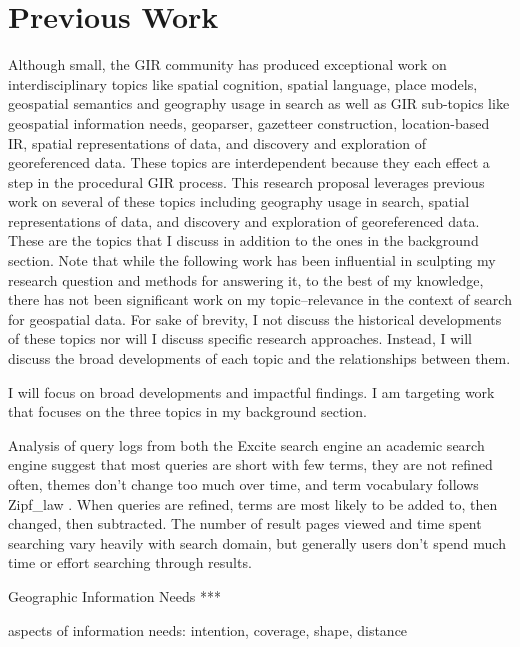 \chapter{Previous Work} \label{ch:[chapter 4 label]}

Although small, the GIR community has produced exceptional work on interdisciplinary topics like spatial cognition, spatial language, place models, geospatial semantics and geography usage in search as well as GIR sub-topics like geospatial information needs, \gls{geoparser}, \gls{gazetteer} construction, location-based IR, spatial representations of data, and discovery and exploration of \gls{georeference}d data. These topics are interdependent because they each effect a step in the procedural GIR process. This research proposal leverages previous work on several of these topics including geography usage in search, spatial representations of data, and discovery and exploration of georeferenced data. These are the topics that I discuss in addition to the ones in the background section. Note that while the following work has been influential in sculpting my research question and methods for answering it, to the best of my knowledge, there has not been significant work on my topic–relevance in the context of search for geospatial data. For sake of brevity, I not discuss the historical developments of these topics nor will I discuss specific research approaches. Instead, I will discuss the broad developments of each topic and the relationships between them.

I will focus on broad developments and impactful findings. I am targeting work that focuses on the three topics in my background section.

Analysis of query logs from both the Excite search engine an academic search engine suggest that most queries are short with few terms, they are not refined often, themes don't change too much over time, and term vocabulary follows \gls{Zipf_law} \cite{Spink2001} \cite{Spink2002} \cite{Wang2003} \cite{Han2014}. When queries are refined, terms are most likely to be added to, then changed, then subtracted. The number of result pages viewed and time spent searching vary heavily with search domain, but generally users don't spend much time or effort searching through results.



Geographic Information Needs ***

aspects of information needs: intention, coverage, shape, distance \cite{Henrich2007}

